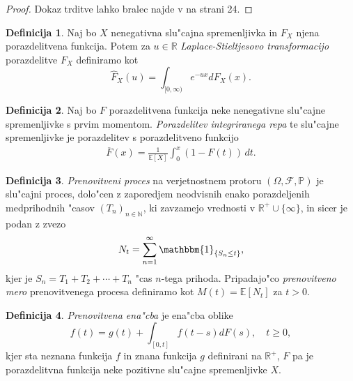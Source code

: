 \documentclass[12pt, a4paper, reqno]{amsart}
\theoremstyle{definition}
\newtheorem{definicija}{Definicija}[section]
\theoremstyle{plain}
\newcommand{\R}{\mathbb{R}}
\newcommand{\N}{\mathbb{N}}
\newcommand{\E}{\mathbb{E}}
\newcommand{\Prob}{\mathbb{P}}
\newcommand{\1}{\mathds{1}}
\begin{document}
    \begin{proof}
        Dokaz trditve lahko bralec najde v \cite{4} na strani 24.
    \end{proof}

    \begin{definicija}
        Naj bo $X$ nenegativna slu"cajna spremenljivka in $F_X$ njena porazdelitvena funkcija. 
        Potem za $u\in\R$ \textit{Laplace-Stieltjesovo transformacijo} porazdelitve $F_X$ definiramo kot
        \begin{equation*}
            \hat{F}_X(u) = \int_{[0, \infty)}e^{-ux}dF_X(x).
        \end{equation*}
        \label{def:LaplaceStiltjesovaTransformacija}
    \end{definicija}

    \begin{definicija}
        Naj bo $F$ porazdelitvena funkcija neke nenegativne slu"cajne spremenljivke s prvim 
        momentom. \textit{Porazdelitev integriranega repa} te slu"cajne spremenljivke je porazdelitev
        s porazdelitveno funkcijo
        \begin{align*}
            \overline{F}(x) = \frac{1}{\mathbb{E}[X]} \int_0^x (1 - F(t)) \, dt.
        \end{align*}

        \label{def:porazdelitevintegriranegaRepa}
    \end{definicija}

    \begin{definicija}
        \textit{Prenovitveni proces} na verjetnostnem protoru $(\Omega, \mathcal{F}, \Prob)$ je slu"cajni 
        proces,
        dolo"cen z zaporedjem neodvisnih enako porazdeljenih medprihodnih "casov $(T_n)_{n\in\N}$, 
        ki zavzamejo vrednosti v $\R^+\cup\{\infty\}$, in sicer je podan z zvezo 
        \begin{equation*}
            N_t = \sum_{n=1}^{\infty}\mathbbm{1}_{\{S_n\leq t\}},
        \end{equation*}
        kjer je $S_n = T_1 + T_2 + \cdots + T_n$ "cas $n$-tega prihoda. Pripadajo"co 
        \textit{prenovitveno mero} prenovitvenega procesa definiramo kot $M(t) = \E\left[N_t\right]$ za 
        $t > 0$.
        \label{def:PrenovitveniProces}
    \end{definicija}

    \begin{definicija}
        \textit{Prenovitvena ena"cba} je ena"cba oblike 
        \begin{equation*}
            f(t) = g(t) + \int_{[0, t]}f(t - s)dF(s), \quad t\geq 0,
        \end{equation*}
        kjer sta neznana funkcija $f$ in znana funkcija $g$ definirani na $\R^+$, $F$ pa je 
        porazdelitvna funkcija neke pozitivne slu"cajne spremenljivke $X$.
        \label{def:prenovitvenaEnacba}
    \end{definicija}
\end{document}
